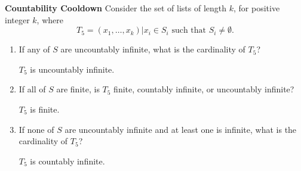 \textbf{Countability Cooldown} \newline
Consider the set of lists of length $k$, for positive integer $k$, where 
\[T_5 = {(x_1, \dotsc, x_k)| x_i \in S_i\text{ such that }S_i  \neq \emptyset}.\]

\begin{enumerate}[label=(\alph*)]
\item If any of $S$ are uncountably infinite, what is the cardinality of $T_5$?
\begin{solution}
$T_5$ is uncountably infinite.
\end{solution}

\item If all of $S$ are finite, is $T_5$ finite, countably infinite, or uncountably infinite? 
\begin{solution}
$T_5$  is finite.
\end{solution}

\item If none of $S$ are uncountably infinite and at least one is infinite, what is the cardinality of $T_5$?
\begin{solution}
$T_5$ is countably infinite.
\end{solution}

\end{enumerate}